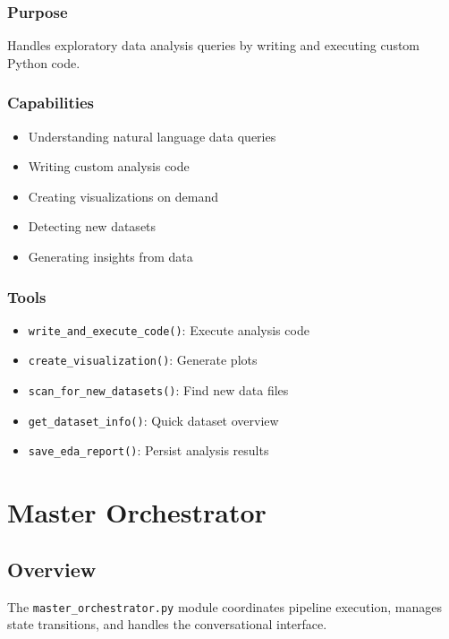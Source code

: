 \documentclass[12pt,a4paper]{report}
\begin{document}
\subsection{Purpose}
Handles exploratory data analysis queries by writing and executing custom Python code.

\subsection{Capabilities}
\begin{itemize}
    \item Understanding natural language data queries
    \item Writing custom analysis code
    \item Creating visualizations on demand
    \item Detecting new datasets
    \item Generating insights from data
\end{itemize}

\subsection{Tools}
\begin{itemize}
    \item \texttt{write\_and\_execute\_code()}: Execute analysis code
    \item \texttt{create\_visualization()}: Generate plots
    \item \texttt{scan\_for\_new\_datasets()}: Find new data files
    \item \texttt{get\_dataset\_info()}: Quick dataset overview
    \item \texttt{save\_eda\_report()}: Persist analysis results
\end{itemize}

\chapter{Master Orchestrator}

\section{Overview}
The \texttt{master\_orchestrator.py} module coordinates pipeline execution, manages state transitions, and handles the conversational interface.
\end{document}
